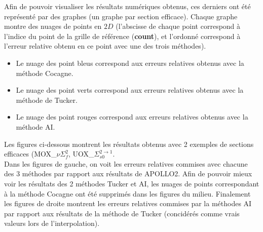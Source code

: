 Afin de pouvoir visualiser les résultats numériques obtenus, ces derniers ont été représenté par des graphes (un graphe par section efficace).
Chaque graphe montre des nuages de points en $2D$ (l'abscisse de chaque point correspond à l'indice du point de la grille de référence (\textbf{count}),
et l'ordonné correspond à l'erreur relative obtenu en ce point avec une des trois méthodes).
\begin{itemize}
\item Le nuage des point bleus correspond aux erreurs relatives obtenus avec la méthode Cocagne.
\item Le nuage des point verts correspond aux erreurs relatives obtenus avec la méthode de Tucker.
\item Le nuage des point rouges correspond aux erreurs relatives obtenus avec la méthode AI.
\end{itemize}
\hspace{0.5cm} Les figures ci-dessous montrent les résultats obtenus avec 2 exemples de sections efficaces (MOX\_$\nu\Sigma_f^2$, UOX\_$\Sigma_{s0}^{2\rightarrow1}$.\\
Dans les figures de gauche, on voit les erreurs relatives commises avec chacune des 3 méthodes par rapport aux résultats de APOLLO2.
Afin de pouvoir mieux voir les résultats des 2 méthodes Tucker et AI, les nuages de points correspondant à la méthode Cocagne ont été supprimés dans les figures du milieu.
Finalement les figures de droite montrent les erreurs relatives commises par la méthodes AI par rapport aux résultats de la méthode de Tucker (concidérés comme vrais valeurs lors de l'interpolation).
